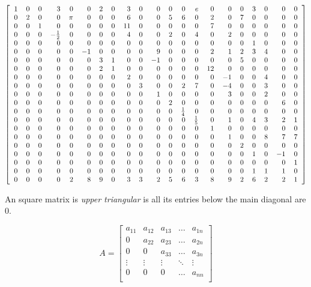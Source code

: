 {{\small
$\left[{
\begin{tabular}{rrrrrrrrrrrrrrrrrrrrr}
1 & 0 & 0 & 3 & 0 & 0 & 2& 0 & 3 & 0 & 0 & 0 & 0 & $e$ & 0 & 0 & 0 & 3 & 0 & 0 & 0 \cr
0 & 2 & 0 & 0 & $\pi$ & 0 & 0 & 0 & 6 & 0 & 0 & 5 & 6 & 0 & 2 & 0 & 7 & 0 & 0 & 0 & 0 \cr
0 & 0 & 1 & 0 & 0 & 0 & 0 & 0 & 11 & 0 & 0 & 0 & 0 & 0 & 7 & 0 & 0 & 0 & 0 & 0 & 0 \cr
0 & 0 & 0 & $-\frac{1}{2}$ & 0 & 0 & 0& 0 & 4 & 0 & 0 & 2 & 0 & 4 & 0 & 2 & 0 & 0 & 0 & 0 & 0 \cr
0 & 0 & 0 & 0 & 0 & 0 & 0 & 0 & 0 & 0 & 0 & 0 & 0 & 0 & 0 & 0 & 0 & 1 & 0 & 0 & 0 \cr
0 & 0 & 0 & 0 & 0 & $-1$ &  0 & 0 & 0 & 0 & 9 & 0 & 0 & 0 & 2 & 1 & 2 & 3 & 4 & 0 & 0 \cr
0 & 0 & 0 & 0 & 0 & 0 & 3 & 1 & 0 & 0 & $-1$ & 0 & 0 & 0 & 0 & 0 & 5 & 0 & 0 & 0 & 0 \cr
0 & 0 & 0 & 0 & 0 & 0 & 2 & 1 & 0 & 0 & 0 & 0 & 0 & 0 & 12 & 0 & 0 & 0 & 0 & 0 & 0 \cr
0 & 0 & 0 & 0 & 0 & 0 & 0 & 0 & 2 & 0 & 0 & 0 & 0 & 0 & 0 & $-1$ & 0 & 0 & 4 & 0 & 0 \cr
0 & 0 & 0 & 0 & 0 & 0 & 0 & 0 & 0 & 3 & 0 & 0 & 2 & 7 & 0 & $-4$ & 0 & 0 & 3 & 0 & 0 \cr
0 & 0 & 0 & 0 & 0 & 0 & 0 & 0 & 0 & 0 & 1 & 0 & 0 & 0 & 0 & 3 & 0 & 0 & 2 & 0 & 0 \cr
0 & 0 & 0 & 0 & 0 & 0 & 0 & 0 & 0 & 0 & 0 & 2 & 0 & 0 & 0 & 0 & 0 & 0 & 0 & 6 & 0 \cr
0 & 0 & 0 & 0 & 0 & 0 & 0 & 0 & 0  & 0 & 0 & 0 & $\frac{1}{4}$ & 0 & 0 & 0 & 0 & 0 & 0 & 0 & 0 \cr
0 & 0 & 0 & 0 & 0 & 0 & 0 & 0 & 0 & 0 & 0 & 0 & 0 & $\frac{1}{5}$ & 0 & 1 & 0 & 4 & 3 & 2 & 1 \cr
0 & 0 & 0 & 0 & 0 & 0 & 0 & 0 & 0 & 0 & 0 & 0 & 0 & 0 & 1 & 0 & 0 & 0 & 0 & 0 & 0 \cr
0 & 0 & 0 & 0 & 0 & 0 & 0 & 0 & 0 & 0 & 0 & 0 & 0 & 0 & 0 & 1 & 0 & 0 & 8 & 7 & 7 \cr
0 & 0 & 0 & 0 & 0 & 0 & 0 & 0 & 0 & 0 & 0 & 0 & 0 & 0 & 0 & 0 & 2 & 0 & 0 & 0 & 0 \cr
0 & 0 & 0 & 0 & 0 & 0 & 0 & 0 & 0 & 0 & 0 & 0 & 0 & 0 & 0 & 0 & 0 & 1 & 0 & $-1$ & 0 \cr
0 & 0 & 0 & 0 & 0 & 0 & 0 & 0 & 0 & 0 & 0 & 0 & 0 & 0 & 0 & 0 & 0 & 0 & 0 & 0 & 1 \cr
0 & 0 & 0 & 0 & 0 & 0 & 0 & 0 & 0 & 0 & 0 & 0 & 0 & 0 & 0 & 0 & 0 & 1 & 1 & 1 & 0 \cr
0 & 0 & 0 & 0 & 2 & 8 & 9 & 0 & 3 & 3 & 2 & 5 & 6 & 3 & 8 & 9 & 2 & 6 & 2 & 2 & 1 \cr
\end{tabular}
}\right]$
}


\newpage

\begin{cbox}[Definition]
An square matrix is \emph{upper triangular} is all its entries below the main diagonal are 0. 
\end{cbox}

\vskip 10mm

$$
A = 
\begin{bmatrix}
a_{11}  & a_{12}  & a_{13} & \dots  & a_{1n} \\
0          & a_{22}  & a_{23} & \dots   & a_{2n} \\
0          &  0         & a_{33} & \dots   & a_{3n} \\
\vdots   &  \vdots & \vdots  & \ddots & \vdots \\
0           & 0         & 0          & \dots   & a_{nn} \\
\end{bmatrix}
$$

}
